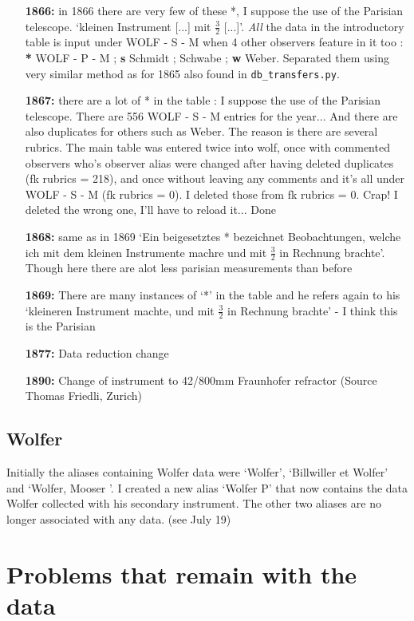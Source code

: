 \documentclass[12pt]{article}
\begin{document}
\begin{itemize}
     \item[\textbf{1866:}] in 1866 there are very few of these *,  I suppose the use of the Parisian telescope. `kleinen Instrument [...] mit $\frac{3}{2}$ [...]'.
     \textit{All} the data in the introductory table is input under WOLF - S - M when 4 other observers feature in it too : \textbf{*} WOLF - P - M ; \textbf{s} Schmidt ; \textbf{\dag} Schwabe ; \textbf{w} Weber. Separated them using very similar method as for 1865 also found in \texttt{db\_transfers.py}. 
  \item[\textbf{1867:}] there are a lot of * in the table : I suppose the use of the Parisian telescope. There are 556 WOLF - S - M entries for the year... And there are also duplicates for others such as Weber. The reason is there are several rubrics. The main table was entered twice into wolf, once with commented observers who's observer alias were changed after having deleted duplicates (fk rubrics = 218), and once without leaving any comments and it's all under WOLF - S - M (fk rubrics = 0). I deleted those from fk rubrics = 0. Crap! I deleted the wrong one, I'll have to reload it... Done
   \item[\textbf{1868:}] same as in 1869 `Ein beigesetztes * bezeichnet Beobachtungen, welche ich mit dem kleinen Instrumente machre und mit $\frac{3}{2}$ in Rechnung brachte'. Though here there are alot less parisian measurements than before
\item[\textbf{1869:}] There are many instances of `*' in the table and he refers again to his `kleineren Instrument machte, und mit $\frac{3}{2}$ in Rechnung brachte' - I think this is the Parisian
 \item[\textbf{1877:}] Data reduction change
 \item[\textbf{1890:}] Change of instrument to 42/800mm Fraunhofer refractor (Source Thomas Friedli, Zurich)
    
\end{itemize}

\subsection{Wolfer}
Initially the aliases containing Wolfer data were `Wolfer', `Billwiller et Wolfer' and `Wolfer, Mooser '. I created a new alias `Wolfer P' that now contains the data Wolfer collected with his secondary instrument. The other two aliases are no longer associated with any data. (see July 19)


\section{Problems that remain with the data}
\end{document}
